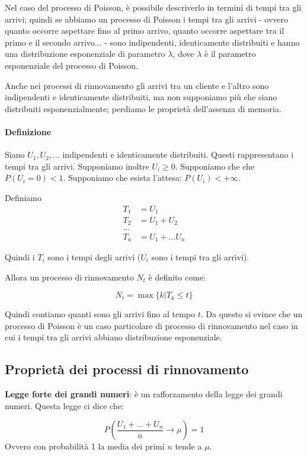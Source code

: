 \documentclass[a4paper,12pt]{book}
\begin{document}
Nel caso del processo di Poisson, è possibile descriverlo in termini di tempi tra gli arrivi; quindi se abbiamo un processo di Poisson i tempi tra gli arrivi - ovvero quanto occorre aspettare fino al primo arrivo, quanto occorre aspettare tra il primo e il secondo arrivo... - sono indipendenti, identicamente distribuiti e hanno una distribuzione esponenziale di parametro $\lambda$, dove $\lambda$ è il parametro esponenziale del processo di Poisson.

Anche nei processi di rinnovamento gli arrivi tra un cliente e l'altro sono indipendenti e identicamente distribuiti, ma non supponiamo più che siano distribuiti esponenzialmente; perdiamo le proprietà dell'assenza di memoria. 

\paragraph{Definizione} 
Siano $ U_1, U_2, ... $ indipendenti e identicamente distribuiti. Questi rappresentano i tempi tra gli arrivi. Supponiamo inoltre $ U_i \ge 0 $. Supponiamo che che $ P(U_i = 0) < 1 $.
Supponiamo che esista l'attesa: $ P(U_i) < +\infty $.

Definiamo 
\begin{align*}
	T_1 & = U_1 \\
	T_2 & = U_1 + U_2 \\
	... & \\
	T_n & = U_1 + ... U_n
\end{align*}

Quindi i $ T_i $ sono i tempi degli arrivi ($ U_i $ sono i tempi tra gli arrivi).

Allora un processo di rinnovamento $ N_t $ è definito come:

$$ N_t = \max\{ k | T_k \le t\}$$

Quindi contiamo quanti sono gli arrivi fino al tempo $ t $. Da questo si evince che un processo di Poisson è un caso particolare di processo di rinnovamento nel caso in cui i tempi tra gli arrivi abbiano distribuzione esponenziale. 

\subsection{Proprietà dei processi di rinnovamento}
\textbf{Legge forte dei grandi numeri}: è un rafforzamento della legge dei grandi numeri. Questa legge ci dice che:

$$ P(\frac{U_1 + ... + U_n}{n} \to \mu) = 1 $$
Ovvero con probabilità 1 la media dei primi $ n $ tende a $ \mu $.
\end{document}

